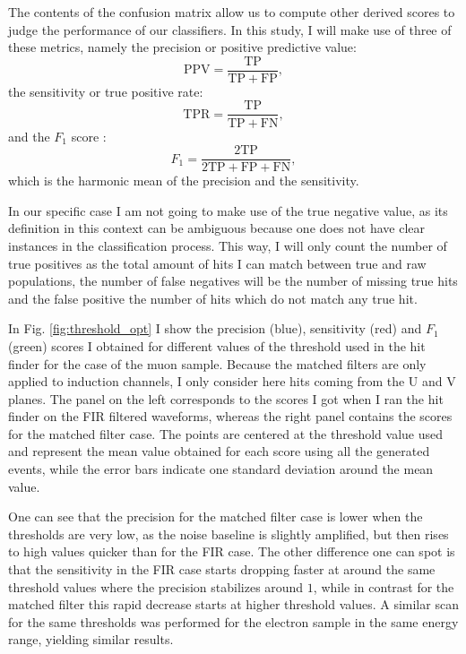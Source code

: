 The contents of the confusion matrix allow us to compute other derived scores to judge the performance of our classifiers. In this study, I will make use of three of these metrics, namely the precision or positive predictive value:
\begin{equation}
	\mathrm{PPV} = \frac{\mathrm{TP}}{\mathrm{TP} + \mathrm{FP}},
\end{equation}
the sensitivity or true positive rate:
\begin{equation}
	\mathrm{TPR} = \frac{\mathrm{TP}}{\mathrm{TP} + \mathrm{FN}},
\end{equation}
and the $F_{1}$ score \cite{Taha2015}:
\begin{equation}
	F_{1} = \frac{\mathrm{2 TP}}{2\mathrm{TP} + \mathrm{FP} + \mathrm{FN}},
\end{equation}
which is the harmonic mean of the precision and the sensitivity.

In our specific case I am not going to make use of the true negative value, as its definition in this context can be ambiguous because one does not have clear instances in the classification process. This way, I will only count the number of true positives as the total amount of hits I can match between true and raw populations, the number of false negatives will be the number of missing true hits and the false positive the number of hits which do not match any true hit.

In Fig. \ref{fig:threshold_opt} I show the precision (blue), sensitivity (red) and $F_{1}$ (green) scores I obtained for different values of the threshold used in the hit finder for the case of the muon sample. Because the matched filters are only applied to induction channels, I only consider here hits coming from the U and V planes. The panel on the left corresponds to the scores I got when I ran the hit finder on the FIR filtered waveforms, whereas the right panel contains the scores for the matched filter case. The points are centered at the threshold value used and represent the mean value obtained for each score using all the generated events, while the error bars indicate one standard deviation around the mean value.

One can see that the precision for the matched filter case is lower when the thresholds are very low, as the noise baseline is slightly amplified, but then rises to high values quicker than for the FIR case. The other difference one can spot is that the sensitivity in the FIR case starts dropping faster at around the same threshold values where the precision stabilizes around $1$, while in contrast for the matched filter this rapid decrease starts at higher threshold values. A similar scan for the same thresholds was performed for the electron sample in the same energy range, yielding similar results.

